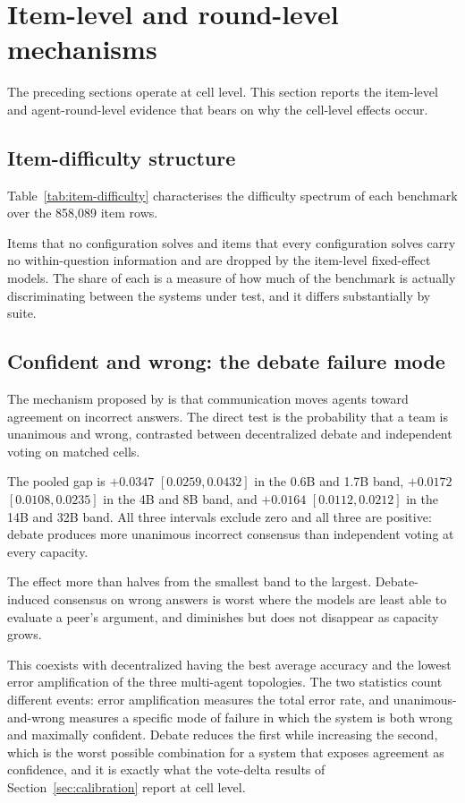 \section{Item-level and round-level mechanisms}
\label{sec:items}

The preceding sections operate at cell level. This section reports the item-level and
agent-round-level evidence that bears on why the cell-level effects occur.

\subsection{Item-difficulty structure}

Table~\ref{tab:item-difficulty} characterises the difficulty spectrum of each benchmark
over the 858{,}089 item rows.


Items that no configuration solves and items that every configuration solves carry no
within-question information and are dropped by the item-level fixed-effect models. The
share of each is a measure of how much of the benchmark is actually discriminating between
the systems under test, and it differs substantially by suite.

\subsection{Confident and wrong: the debate failure mode}

The mechanism proposed by \citet{wynn2025debate} is that communication moves agents toward
agreement on incorrect answers. The direct test is the probability that a team is unanimous
and wrong, contrasted between decentralized debate and independent voting on matched cells.

The pooled gap is $+0.0347$ $[0.0259, 0.0432]$ in the 0.6B and 1.7B band, $+0.0172$
$[0.0108, 0.0235]$ in the 4B and 8B band, and $+0.0164$ $[0.0112, 0.0212]$ in the 14B and
32B band. All three intervals exclude zero and all three are positive: debate produces more
unanimous incorrect consensus than independent voting at every capacity.

The effect more than halves from the smallest band to the largest. Debate-induced
consensus on wrong answers is worst where the models are least able to evaluate a peer's
argument, and diminishes but does not disappear as capacity grows.

This coexists with decentralized having the best average accuracy and the lowest error
amplification of the three multi-agent topologies. The two statistics count different
events: error amplification measures the total error rate, and unanimous-and-wrong measures
a specific mode of failure in which the system is both wrong and maximally confident. Debate
reduces the first while increasing the second, which is the worst possible combination for a
system that exposes agreement as confidence, and it is exactly what the vote-delta results
of Section~\ref{sec:calibration} report at cell level.

